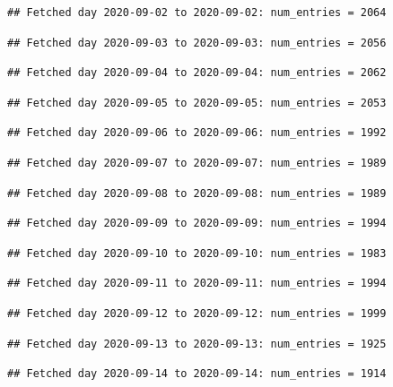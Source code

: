 \documentclass[]{article}
\begin{document}
\begin{verbatim}
## Fetched day 2020-09-02 to 2020-09-02: num_entries = 2064
\end{verbatim}

\begin{verbatim}
## Fetched day 2020-09-03 to 2020-09-03: num_entries = 2056
\end{verbatim}

\begin{verbatim}
## Fetched day 2020-09-04 to 2020-09-04: num_entries = 2062
\end{verbatim}

\begin{verbatim}
## Fetched day 2020-09-05 to 2020-09-05: num_entries = 2053
\end{verbatim}

\begin{verbatim}
## Fetched day 2020-09-06 to 2020-09-06: num_entries = 1992
\end{verbatim}

\begin{verbatim}
## Fetched day 2020-09-07 to 2020-09-07: num_entries = 1989
\end{verbatim}

\begin{verbatim}
## Fetched day 2020-09-08 to 2020-09-08: num_entries = 1989
\end{verbatim}

\begin{verbatim}
## Fetched day 2020-09-09 to 2020-09-09: num_entries = 1994
\end{verbatim}

\begin{verbatim}
## Fetched day 2020-09-10 to 2020-09-10: num_entries = 1983
\end{verbatim}

\begin{verbatim}
## Fetched day 2020-09-11 to 2020-09-11: num_entries = 1994
\end{verbatim}

\begin{verbatim}
## Fetched day 2020-09-12 to 2020-09-12: num_entries = 1999
\end{verbatim}

\begin{verbatim}
## Fetched day 2020-09-13 to 2020-09-13: num_entries = 1925
\end{verbatim}

\begin{verbatim}
## Fetched day 2020-09-14 to 2020-09-14: num_entries = 1914
\end{verbatim}
\end{document}
